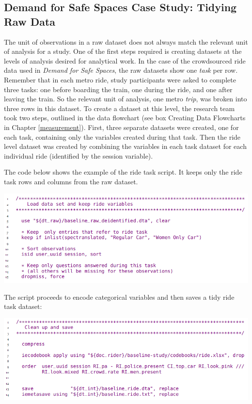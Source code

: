 \documentclass[
]{book}
\begin{document}
\begin{ex}
\hypertarget{demand-for-safe-spaces-case-study-tidying-raw-data}{%
\subsection{Demand for Safe Spaces Case Study: Tidying Raw Data}\label{demand-for-safe-spaces-case-study-tidying-raw-data}}

The unit of observations in a raw dataset does not always match the relevant unit of analysis for a study. One of the first steps required is creating datasets at the levels of analysis desired for analytical work. In the case of the crowdsourced ride data used in \emph{Demand for Safe Spaces}, the raw datasets show one \emph{task} per row. Remember that in each metro ride, study participants were asked to complete three tasks: one before boarding the train, one during the ride, and one after leaving the train. So the relevant unit of analysis, one metro \emph{trip}, was broken into three rows in this dataset. To create a dataset at this level, the research team took two steps, outlined in the data flowchart (see box Creating Data Flowcharts in Chapter \ref{measurement}). First, three separate datasets were created, one for each task, containing only the variables created during that task. Then the ride level dataset was created by combining the variables in each task dataset for each individual ride (identified by the session variable).

The code below shows the example of the ride task script. It keeps only the ride task rows and columns from the raw dataset.

\includegraphics{examples/ch5-tidying-raw-data.png}

The script proceeds to encode categorical variables and then saves a tidy ride task dataset:

\includegraphics{examples/ch5-tidying-raw-data2.png}


\end{ex}
\end{document}
